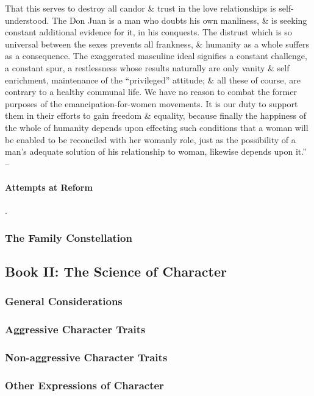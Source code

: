 \documentclass{article}
\begin{document}
That this serves to destroy all candor \& trust in the love relationships is self-understood. The Don Juan is a man who doubts his own manliness, \& is seeking constant additional evidence for it, in his conquests. The distrust which is so universal between the sexes prevents all frankness, \& humanity as a whole suffers as a consequence. The exaggerated masculine ideal signifies a constant challenge, a constant spur, a restlessness whose results naturally are only vanity \& self enrichment, maintenance of the ``privileged'' attitude; \& all these of course, are contrary to a healthy communal life. We have no reason to combat the former purposes of the emancipation-for-women movements. It is our duty to support them in their efforts to gain freedom \& equality, because finally the happiness of the whole of humanity depends upon effecting such conditions that a woman will be enabled to be reconciled with her womanly role, just as the possibility of a man's adequate solution of his relationship to woman, likewise depends upon it.'' -- \cite[pp. 145--147]{Adler_human_nature}

\paragraph{Attempts at Reform}.

\subsubsection{The Family Constellation}

\subsection{Book II: The Science of Character}

\subsubsection{General Considerations}

\subsubsection{Aggressive Character Traits}

\subsubsection{Non-aggressive Character Traits}

\subsubsection{Other Expressions of Character}
\end{document}
